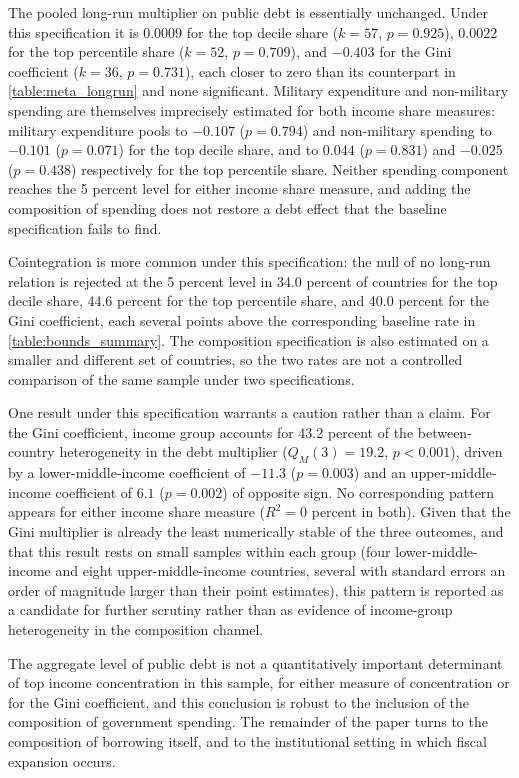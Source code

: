 \documentclass[12pt, titlepage]{article}
\numberwithin{equation}{section}
\begin{document}
The pooled long-run multiplier on public debt is essentially unchanged. Under
this specification it is $0.0009$ for the top decile share ($k=57$,
$p=0.925$), $0.0022$ for the top percentile share ($k=52$, $p=0.709$), and
$-0.403$ for the Gini coefficient ($k=36$, $p=0.731$), each closer to zero
than its counterpart in \autoref{table:meta_longrun} and none significant.
Military expenditure and non-military spending are themselves imprecisely
estimated for both income share measures: military expenditure pools to
$-0.107$ ($p=0.794$) and non-military spending to $-0.101$ ($p=0.071$) for the
top decile share, and to $0.044$ ($p=0.831$) and $-0.025$ ($p=0.438$)
respectively for the top percentile share. Neither spending component reaches
the 5 percent level for either income share measure, and adding the
composition of spending does not restore a debt effect that the baseline
specification fails to find.

Cointegration is more common under this specification: the null of no
long-run relation is rejected at the 5 percent level in 34.0 percent of
countries for the top decile share, 44.6 percent for the top percentile share,
and 40.0 percent for the Gini coefficient, each several points above the
corresponding baseline rate in \autoref{table:bounds_summary}. The composition
specification is also estimated on a smaller and different set of countries,
so the two rates are not a controlled comparison of the same sample under two
specifications.

One result under this specification warrants a caution rather than a claim.
For the Gini coefficient, income group accounts for 43.2 percent of the
between-country heterogeneity in the debt multiplier ($Q_{M}(3)=19.2$,
$p<0.001$), driven by a lower-middle-income coefficient of $-11.3$
($p=0.003$) and an upper-middle-income coefficient of $6.1$ ($p=0.002$) of
opposite sign. No corresponding pattern appears for either income share
measure ($R^{2}=0$ percent in both). Given that the Gini multiplier is already
the least numerically stable of the three outcomes, and that this result rests
on small samples within each group (four lower-middle-income and eight
upper-middle-income countries, several with standard errors an order of
magnitude larger than their point estimates), this pattern is reported as a
candidate for further scrutiny rather than as evidence of income-group
heterogeneity in the composition channel.

The aggregate level of public debt is not a quantitatively important
determinant of top income concentration in this sample, for either measure of
concentration or for the Gini coefficient, and this conclusion is robust to
the inclusion of the composition of government spending. The remainder of the
paper turns to the composition of borrowing itself, and to the institutional
setting in which fiscal expansion occurs.
\end{document}
